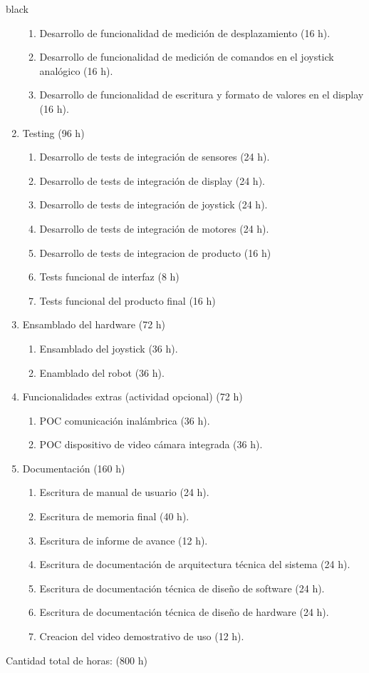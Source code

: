 \documentclass[
11pt, %
codirector, %
]{charter}
\begin{document}
\begin{consigna}{black}
\begin{enumerate}
\begin{enumerate}
	\item Desarrollo de funcionalidad de medición de desplazamiento (16 h).
	\item Desarrollo de funcionalidad de medición de comandos en el joystick analógico (16 h).
	\item Desarrollo de funcionalidad de escritura y formato de valores en el display (16 h).
	\end{enumerate}
\item Testing (96 h)
	\begin{enumerate}
	\item Desarrollo de tests de integración de sensores (24 h).
	\item Desarrollo de tests de integración de display (24 h).
	\item Desarrollo de tests de integración de joystick (24 h).
	\item Desarrollo de tests de integración de motores (24 h).
	\item Desarrollo de tests de integracion de producto (16 h)
	\item Tests funcional de interfaz (8 h)
	\item Tests funcional del producto final (16 h)
	\end{enumerate}
\item Ensamblado del hardware (72 h)
	\begin{enumerate}
	\item Ensamblado del joystick (36 h).
	\item Enamblado del robot (36 h).
	\end{enumerate}
\item Funcionalidades extras (actividad opcional) (72 h)
	\begin{enumerate}
	\item POC comunicación inalámbrica (36 h).
	\item POC dispositivo de video cámara integrada (36 h).
	\end{enumerate}
\item Documentación (160 h)
	\begin{enumerate}				
	\item Escritura de manual de usuario (24 h).			
	\item Escritura de memoria final (40 h).
	\item Escritura de informe de avance (12 h).
	\item Escritura de documentación de arquitectura técnica del sistema (24 h).
	\item Escritura de documentación técnica de diseño de software (24 h).
	\item Escritura de documentación técnica de diseño de hardware (24 h).		
	\item Creacion del video demostrativo de uso (12 h).				
	\end{enumerate}	
\end{enumerate}

Cantidad total de horas: (800 h)

\end{consigna}
\end{document}
